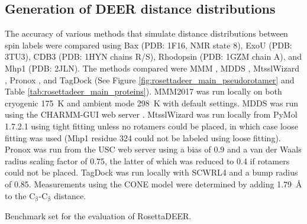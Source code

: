 \subsection{Generation of DEER distance distributions}

The accuracy of various methods that simulate distance distributions between spin labels were compared using Bax (PDB: 1F16, NMR state 8), ExoU (PDB: 3TU3), CDB3 (PDB: 1HYN chains R/S), Rhodopsin (PDB: 1GZM chain A), and Mhp1 (PDB: 2JLN). The methods compared were MMM \citep*{Polyhach2011}, MDDS \citep*{Islam2013}, MtsslWizard \citep*{Hagelueken2012}, Pronox \citep*{Hatmal2012}, and TagDock \citep*{Edwards2014} (See Figure \ref{fig:rosettadeer_main_pseudorotamer} and Table \ref{tab:rosettadeer_main_proteins}). MMM2017 was run locally on both cryogenic \SI{175}{K} and ambient mode \SI{298}{K} with default settings. MDDS was run using the CHARMM-GUI web server \citep*{Jo2014}. MtsslWizard was run locally from PyMol 1.7.2.1 using tight fitting unless no rotamers could be placed, in which case loose fitting was used (Mhp1 residue 324 could not be labeled using loose fitting). Pronox was run from the USC web server using a bias of 0.9 and a van der Waals radius scaling factor of 0.75, the latter of which was reduced to 0.4 if rotamers could not be placed. TagDock was run locally with SCWRL4 \citep*{Krivov2009} and a bump radius of 0.85. Measurements using the CONE model \citep*{Alexander2008, Hirst2011} were determined by adding \SI{1.79}{\angstrom} to the $\mathrm{C_{\upbeta}}$-$\mathrm{C_{\upbeta}}$ distance.

\begin{table}
\scriptsize
\renewcommand{\tabcolsep}{0.15cm}
\centering
\caption[Benchmark set for the evaluation of RosettaDEER.]{Benchmark set for the evaluation of RosettaDEER.}

\label{tab:rosettadeer_main_proteins}
\end{table}

